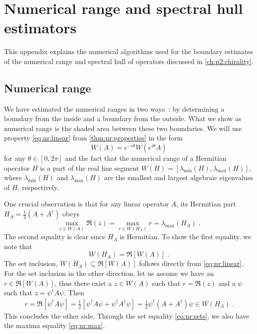 \chapter{Numerical range and spectral hull estimators}
\label{ch:appendix:C}
\label{ch:appendix:nr:ch:estimator}


This appendix explains the numerical algorithms used for the boundary estimates of the numerical range and spectral hull of operators discussed in \cref{ch:p2:chirality}.

\section{Numerical range}
\label{app:C:numerical:range}

We have estimated the numerical ranges in two ways~\cite{johnson1978numerical}: by determining a boundary from the inside and a boundary from the outside.
What we show as numerical range is the shaded area between these two boundaries.
We will use property \cref{eq:nr:linear} from \cref{thm:nr:properties} in the form
\begin{equation} \label{eq:nr:linear:theta}
W(A) = e^{-i \theta} W(e^{i \theta} A)
\end{equation}
for any $\theta \in [0, 2 \pi]$ and the fact that the numerical range of a Hermitian operator $H$ is a part of the real line segment $W(H) = [\lambda_{\text{min}}(H), \lambda_{\text{max}}(H)]$, where $\lambda_{\text{min}}(H)$ and $\lambda_{\text{max}}(H)$ are the smallest and largest algebraic eigenvalues of $H$, respectively.

One crucial observation is that for any linear operator $A$, its Hermitian part $H_A = \frac{1}{2} ( A + A^{\dagger} )$ obeys
\begin{equation} \label{eq:nr:max}
\max_{z \in W(A)} \Re(z) = \max_{r \in W(H_A)} r = \lambda_{\text{max}}(H_A)\;.
\end{equation}
The second equality is clear since $H_A$ is Hermitian.
To show the first equality, we note that
\begin{equation} \label{eq:nr:sets}
W(H_A) = \Re[W(A)] \;.
\end{equation}
The set inclusion, $W(H_A) \subseteq \Re[W(A)]$ follows directly from \cref{eq:nr:linear}.
For the set inclusion in the other direction, let us assume we have an $r \in \Re[W(A)]$, thus there exist a $z \in W(A)$ such that $r = \Re(z)$ and a $\psi$ such that $z = \psi^{\dagger} A \psi$.
Then
\begin{align}
r
= \Re [\psi^{\dagger} A \psi]
= \frac{1}{2} \left[ \psi^{\dagger} A \psi + \psi^{\dagger} A^{\dagger} \psi \right]
= \frac{1}{2} \psi^{\dagger} (A+A^{\dagger}) \psi
\in W(H_A) \,.
\end{align}
This concludes the other side.
Through the set equality \cref{eq:nr:sets}, we also have the maxima equality \cref{eq:nr:max}.

